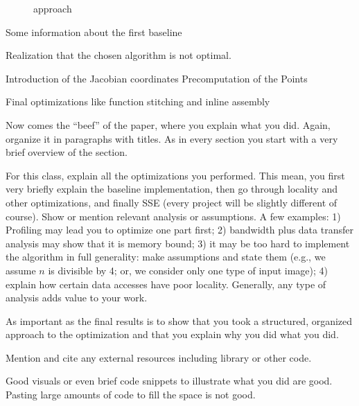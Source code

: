 \begin{figure}[h!]

\caption{approach\label{fig:method}}
\end{figure}

Some information about the first baseline


Realization that the chosen algorithm is not optimal.

Introduction of the Jacobian coordinates
Precomputation of the Points

Final optimizations like function stitching and inline assembly 

Now comes the ``beef'' of the paper, where you explain what you
did. Again, organize it in paragraphs with titles. As in every section
you start with a very brief overview of the section.

For this class, explain all the optimizations you performed. This mean, you first very briefly
explain the baseline implementation, then go through locality and other optimizations, and finally SSE (every project will be slightly different of course). Show or mention relevant analysis or assumptions. A few examples: 1) Profiling may lead you to optimize one part first; 2) bandwidth plus data transfer analysis may show that it is memory bound; 3) it may be too hard to implement the algorithm in full generality: make assumptions and state them (e.g., we assume $n$ is divisible by 4; or, we consider only one type of input image); 4) explain how certain data accesses have poor locality. Generally, any type of analysis adds value to your work.

As important as the final results is to show that you took a structured, organized approach to the optimization and that you explain why you did what you did.

Mention and cite any external resources including library or other code.

Good visuals or even brief code snippets to illustrate what you did are good. Pasting large amounts of code to fill the space is not good.
